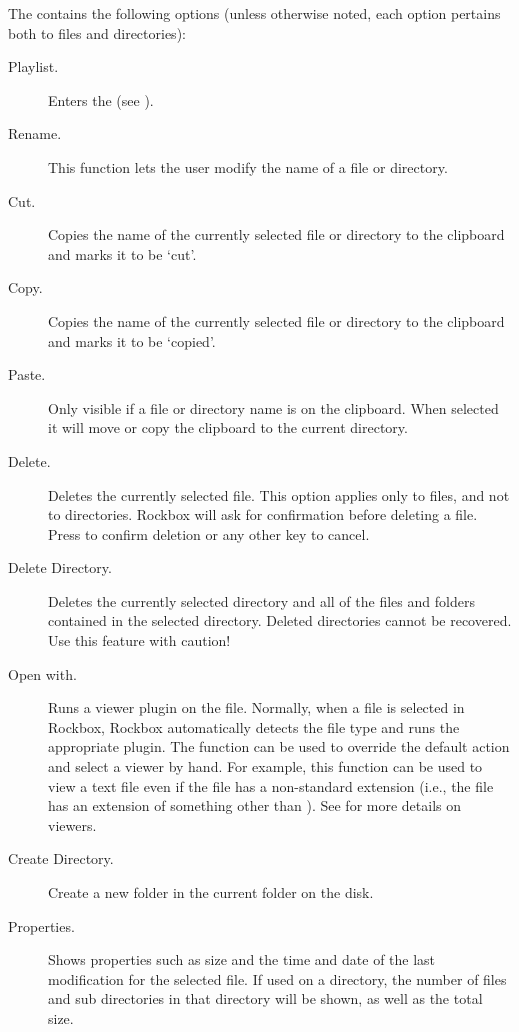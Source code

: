 
The  contains the following options (unless otherwise noted, 
each option pertains both to files and directories):

\begin{description}
\item [Playlist.]
  Enters the  (see ).
\item [Rename.]
  This function lets the user modify the name of a file or directory.
\item [Cut.]
  Copies the name of the currently selected file or directory to the clipboard
  and marks it to be `cut'.
\item [Copy.]
  Copies the name of the currently selected file or directory to the clipboard
  and marks it to be `copied'.
\item [Paste.]
  Only visible if a file or directory name is on the clipboard. When selected
  it will move or copy the clipboard to the current directory.
\item [Delete.]
  Deletes the currently selected file. This option applies only to files, and
  not to directories. Rockbox will ask for confirmation before deleting a file.
  Press \ActionYesNoAccept{}
  to confirm deletion or any other key to cancel.
\item [Delete Directory.]
  Deletes the currently selected directory and all of the files and folders
  contained in the selected directory.  Deleted directories cannot be recovered.
  Use this feature with caution!
\item [Open with.]
  Runs a viewer plugin on the file. Normally, when a file is selected in Rockbox,
  Rockbox automatically detects the file type and runs the appropriate plugin.
  The  function can be used to override the default action and
  select a viewer by hand.
  For example, this function can be used to view a text file
  even if the file has a non-standard extension (i.e., the file has an extension
  of something other than ). See 
  for more details on viewers.
\item [Create Directory.]
  Create a new folder in the current folder on the disk.
\item [Properties.]
  Shows properties such as size and the time and date of the last modification
  for the selected file. If used on a directory, the number of files and sub
  directories in that directory will be shown, as well as the total size.
\end{description}

